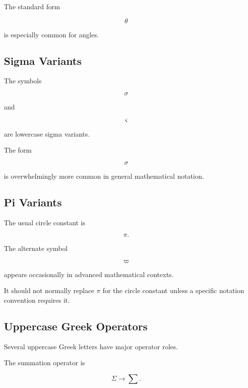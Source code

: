 The standard form

\[
\theta
\]

is especially common for angles.

\subsection{Sigma Variants}
\label{subsec:sigma-variants}

The symbols

\[
\boxed{
\sigma
}
\]

and

\[
\boxed{
\varsigma
}
\]

are lowercase sigma variants.

The form

\[
\sigma
\]

is overwhelmingly more common in general mathematical notation.

\subsection{Pi Variants}
\label{subsec:pi-variants}

The usual circle constant is

\[
\boxed{
\pi.
}
\]

The alternate symbol

\[
\boxed{
\varpi
}
\]

appears occasionally in advanced mathematical contexts.

It should not normally replace \(\pi\) for the circle constant unless a
specific notation convention requires it.

\subsection{Uppercase Greek Operators}
\label{subsec:uppercase-greek-operators}

Several uppercase Greek letters have major operator roles.

The summation operator is

\[
\boxed{
\Sigma
\longrightarrow
\sum.
}
\]

